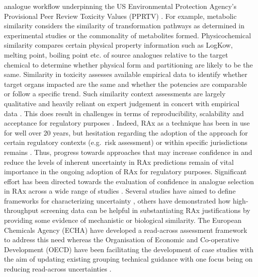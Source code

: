 \documentclass[
  super,
  preprint,
  3p]{elsarticle}
\begin{document}
analogue workflow underpinning the US Environmental Protection Agency's
Provisional Peer Review Toxicity Values (PPRTV)
\citep{wang_application_2012}. For example, metabolic similarity
considers the similarity of transformation pathways as determined in
experimental studies or the commonality of metabolites formed.
Physicochemical similarity compares certain physical property
information such as LogKow, melting point, boiling point etc. of source
analogues relative to the target chemical to determine whether physical
form and partitioning are likely to be the same. Similarity in toxicity
assesses available empirical data to identify whether target organs
impacted are the same and whether the potencies are comparable or follow
a specific trend. Such similarity context assessments are largely
qualitative and heavily reliant on expert judgement in concert with
empirical data \citep{patlewicz_building_2015}. This does result in
challenges in terms of reproducibility, scalability and acceptance for
regulatory purposes \citep{shah_systematically_2016}. Indeed, RAx as a
technique has been in use for well over 20 years, but hesitation
regarding the adoption of the approach for certain regulatory contexts
(e.g.~risk assessment) or within specific jurisdictions remains
\citep{patlewicz_towards_2023}. Thus, progress towards approaches that
may increase confidence in and reduce the levels of inherent uncertainty
in RAx predictions remain of vital importance in the ongoing adoption of
RAx for regulatory purposes. Significant effort has been directed
towards the evaluation of confidence in analogue selection in RAx across
a wide range of studies
\citep{patlewicz_building_2015, blackburn_framework_2014, schultz_assessing_2019, wu_framework_2010, patlewicz_navigating_2018}.
Several studies have aimed to define frameworks for characterizing
uncertainty
\citep{schultz_assessing_2019, schultz_strategy_2015, blackburn_framework_2014, patlewicz_navigating_2018},
others have demonstrated how high-throughput screening data can be
helpful in substantiating RAx justifications
\citep{escher_towards_2019, patlewicz_navigating_2018, rovida_nam-supported_2021}
by providing some evidence of mechanistic or biological similarity. The
European Chemicals Agency (ECHA) have developed a read-across assessment
framework to address this need
\citep{european_chemicals_agency_read-across_2017} whereas the
Organisation of Economic and Co-operative Development (OECD) have been
facilitating the development of case studies with the aim of updating
existing grouping technical guidance \citep{oecd_guidance_2014} with one
focus being on reducing read-across uncertainties \citep{OECD_IATA}.
\end{document}
